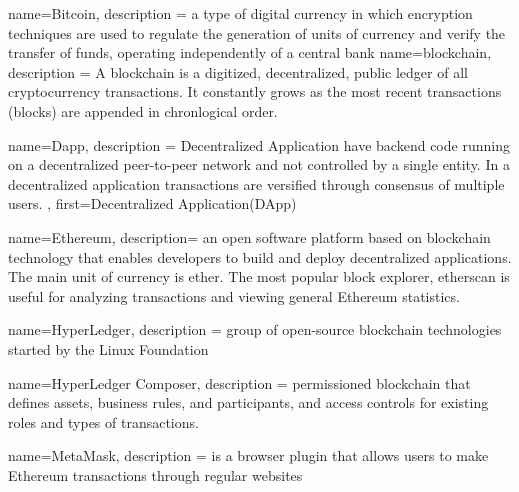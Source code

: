 

{
	name={Bitcoin},
	description ={
		a type of digital currency in which encryption techniques are used to regulate the generation of units of currency and verify the transfer of funds, operating independently of a central bank
	}
}
{
	name={blockchain},
	description ={
		A blockchain is a digitized, decentralized, public ledger of all cryptocurrency transactions.  It constantly grows as the most recent transactions (blocks) are appended in chronlogical order.
	}
}


{
	name={Dapp},
	description ={
		Decentralized Application have backend code running on a decentralized peer-to-peer network and not controlled by a single entity. In a decentralized application transactions are versified through consensus of multiple users.
	},
	first={Decentralized Application(DApp)}
}

{
	name={Ethereum},
	description={
		an open software platform based on blockchain technology that enables developers to build and deploy decentralized applications. The main unit of currency is ether. The most popular block explorer, etherscan is useful for analyzing transactions and viewing general Ethereum statistics.
	}
}

{
	name={HyperLedger},
	description ={
		group of open-source blockchain technologies started by the Linux Foundation
	}
}

{
	name={HyperLedger Composer},
	description ={
		permissioned blockchain that defines assets, business rules, and participants, and access controls for existing roles and types of transactions.
	}
}

{
	name={MetaMask},
	description ={
		is a browser plugin that allows users to make Ethereum transactions through regular websites
	}
}



